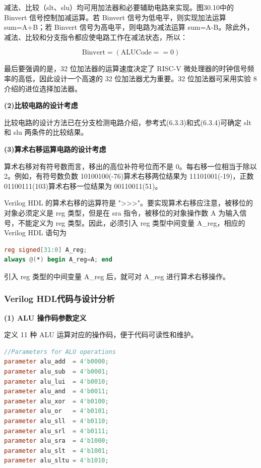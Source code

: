 \documentclass[12pt,a4paper]{article}
\begin{document}
减法、比较（slt、slu）均可用加法器和必要辅助电路来实现。图30.10中的 Binvert 信号控制加减运算。若 Binvert 信号为低电平，则实现加法运算 sum=A+B；若 Binvert 信号为高电平，则电路为减法运算 sum=A-B。除此外，减法、比较和分支指令都应使电路工作在减法状态，所以：

\begin{equation}
\text{Binvert}=(\text{ALUCode}==0)
\tag{6.4.1}
\end{equation}

最后要强调的是，32 位加法器的运算速度决定了 RISC-V 微处理器的时钟信号频率的高低，因此设计一个高速的 32 位加法器尤为重要。32 位加法器可采用实验 8 介绍的进位选择加法器。

\textbf{(2)比较电路的设计考虑}

比较电路的设计方法已在分支检测电路介绍，参考式(6.3.3)和式(6.3.4)可确定 slt 和 slu 两条件的比较结果。

\textbf{(3)算术右移运算电路的设计考虑}

算术右移对有符号数而言，移出的高位补符号位而不是 0。每右移一位相当于除以 2。例如，有符号数负数 10100100(-76)算术右移两位结果为 11101001(-19)，正数 01100111(103)算术右移一位结果为 00110011(51)。

Verilog HDL 的算术右移的运算符是 ">>>"。要实现算术右移应注意，被移位的对象必须定义是 reg 类型，但是在 sra 指令，被移位的对象操作数 A 为输入信号，不能定义为 reg 类型。因此，必须引入 reg 类型中间变量 A\_reg，相应的 Verilog HDL 语句为

\begin{lstlisting}[language=verilog]
reg signed[31:0] A_reg;
always @(*) begin A_reg=A; end
\end{lstlisting}

引入 reg 类型的中间变量 A\_reg 后，就可对 A\_reg 进行算术右移操作。

\subsubsection{Verilog HDL代码与设计分析}

\textbf{(1) ALU 操作码参数定义}

定义 11 种 ALU 运算对应的操作码，便于代码可读性和维护。

\begin{lstlisting}[language=verilog]
//Parameters for ALU operations
parameter alu_add  = 4'b0000;
parameter alu_sub  = 4'b0001;
parameter alu_lui  = 4'b0010;
parameter alu_and  = 4'b0011;
parameter alu_xor  = 4'b0100;
parameter alu_or   = 4'b0101;
parameter alu_sll  = 4'b0110;
parameter alu_srl  = 4'b0111;
parameter alu_sra  = 4'b1000;
parameter alu_slt  = 4'b1001;
parameter alu_sltu = 4'b1010;
\end{lstlisting}
\end{document}
